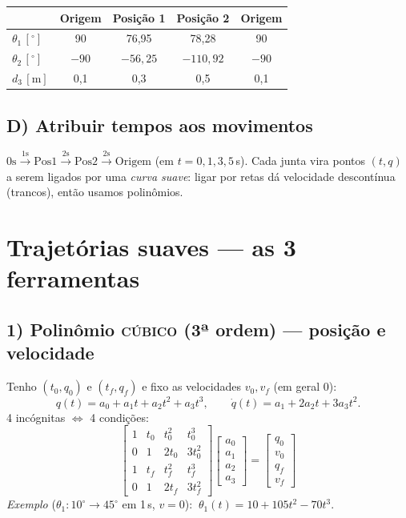 \documentclass[11pt,a4paper]{article}
\begin{document}
\begin{center}
\begin{tabular}{l|cccc}
& Origem & Posição 1 & Posição 2 & Origem\\\hline
$\theta_1\,[^\circ]$ & 90 & 76{,}95 & 78{,}28 & 90\\
$\theta_2\,[^\circ]$ & $-90$ & $-56{,}25$ & $-110{,}92$ & $-90$\\
$d_3\,[\text{m}]$ & 0{,}1 & 0{,}3 & 0{,}5 & 0{,}1\\
\end{tabular}
\end{center}

\subsection*{D) Atribuir tempos aos movimentos}
$0\text{s} \xrightarrow{1\text{s}} \text{Pos1} \xrightarrow{2\text{s}}
 \text{Pos2} \xrightarrow{2\text{s}} \text{Origem}$ \;(em $t=0,1,3,5$\,s).
Cada junta vira pontos $(t, q)$ a serem ligados por uma \emph{curva suave}:
ligar por retas dá velocidade descontínua (trancos), então usamos polinômios.

\section*{\textcolor{laranja}{Trajetórias suaves — as 3 ferramentas}}

\subsection*{1) Polinômio \textsc{cúbico} (3ª ordem) — posição e velocidade}
Tenho $(t_0,q_0)$ e $(t_f,q_f)$ e fixo as velocidades $v_0,v_f$ (em geral 0):
\[
q(t)=a_0+a_1 t+a_2 t^2+a_3 t^3, \qquad
\dot q(t)=a_1+2a_2 t+3a_3 t^2.
\]
4 incógnitas $\Leftrightarrow$ 4 condições:
\[
\begin{bmatrix}
1 & t_0 & t_0^2 & t_0^3\\
0 & 1 & 2t_0 & 3t_0^2\\
1 & t_f & t_f^2 & t_f^3\\
0 & 1 & 2t_f & 3t_f^2
\end{bmatrix}
\begin{bmatrix} a_0\\a_1\\a_2\\a_3 \end{bmatrix}
=
\begin{bmatrix} q_0\\ v_0\\ q_f\\ v_f \end{bmatrix}
\]
\textit{Exemplo} ($\theta_1:10^\circ\!\to\!45^\circ$ em 1\,s, $v=0$):
$\ \theta_1(t)=10+105t^2-70t^3$.
\end{document}
